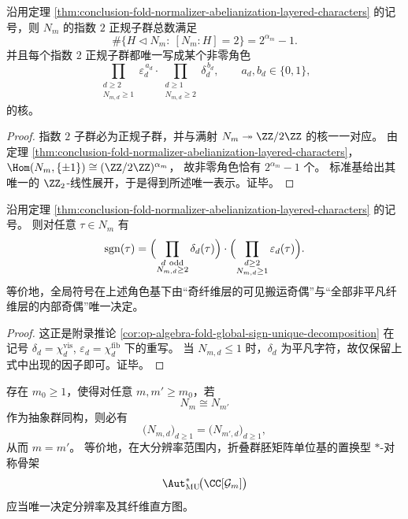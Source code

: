 \begin{corollary}\label{cor:conclusion-fold-normalizer-index-two-quotients}
沿用定理 \ref{thm:conclusion-fold-normalizer-abelianization-layered-characters} 的记号，则 \(N_m\) 的指数 \(2\) 正规子群总数满足
\[
\#\{H\lhd N_m:\ [N_m:H]=2\}=2^{\alpha_m}-1.
\]
并且每个指数 \(2\) 正规子群都唯一写成某个非零角色
\[
\prod_{\substack{d\ge 2\\ N_{m,d}\ge 1}}\varepsilon_d^{\,a_d}\cdot
\prod_{\substack{d\ge 1\\ N_{m,d}\ge 2}}\delta_d^{\,b_d},
\qquad
a_d,b_d\in\{0,1\},
\]
的核。
\end{corollary}
\begin{proof}
指数 \(2\) 子群必为正规子群，并与满射
\(
N_m\twoheadrightarrow \ZZ/2\ZZ
\)
的核一一对应。
由定理 \ref{thm:conclusion-fold-normalizer-abelianization-layered-characters}，
\(
\Hom(N_m,\{\pm1\})\cong (\ZZ/2\ZZ)^{\alpha_m}
\)，
故非零角色恰有 \(2^{\alpha_m}-1\) 个。
标准基给出其唯一的 \(\ZZ_2\)-线性展开，于是得到所述唯一表示。证毕。
\end{proof}

\begin{theorem}[全局符号同态的纤维规模分层精确因子化]\label{thm:conclusion-fold-normalizer-global-sign-layer-factorization}
沿用定理 \ref{thm:conclusion-fold-normalizer-abelianization-layered-characters} 的记号。
则对任意 \(\tau\in N_m\) 有
\[
\operatorname{sgn}(\tau)
=
\Bigl(\prod_{\substack{d\ \mathrm{odd}\\ N_{m,d}\ge 2}}\delta_d(\tau)\Bigr)\cdot
\Bigl(\prod_{\substack{d\ge 2\\ N_{m,d}\ge 1}}\varepsilon_d(\tau)\Bigr).
\]
等价地，全局符号在上述角色基下由“奇纤维层的可见搬运奇偶”与“全部非平凡纤维层的内部奇偶”唯一决定。
\end{theorem}
\begin{proof}
这正是附录推论 \ref{cor:op-algebra-fold-global-sign-unique-decomposition} 在记号
\(
\delta_d=\chi_d^{\mathrm{vis}}
\),
\(
\varepsilon_d=\chi_d^{\mathrm{fib}}
\)
下的重写。
当 \(N_{m,d}\le 1\) 时，\(\delta_d\) 为平凡字符，故仅保留上式中出现的因子即可。证毕。
\end{proof}

\begin{conjecture}[正常化子群的分辨率刚性]\label{conj:conclusion-fold-normalizer-resolution-rigidity}
存在 \(m_0\ge 1\)，使得对任意 \(m,m'\ge m_0\)，若
\[
N_m\cong N_{m'}
\]
作为抽象群同构，则必有
\[
\bigl(N_{m,d}\bigr)_{d\ge 1}=\bigl(N_{m',d}\bigr)_{d\ge 1},
\]
从而 \(m=m'\)。
等价地，在大分辨率范围内，折叠群胚矩阵单位基的置换型 \(\ast\)-对称骨架
\[
\Aut_{\mathrm{MU}}^{\ast}\!\bigl(\CC[\mathcal G_m]\bigr)
\]
应当唯一决定分辨率及其纤维直方图。
\end{conjecture}

